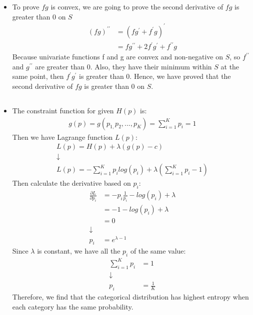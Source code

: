 \documentclass[pdftex,11pt]{article}
\begin{document}
\begin{itemize}
		\item To prove $fg$ is convex, we are going to prove the second derivative of $fg$ is greater than 0 on $S$
		\begin{align*}
			(fg)^{\prime\prime} 
			&= (fg^{\prime}+f^{\prime}g)^{\prime}\\
			&= fg^{\prime\prime}+2f^{\prime}g^{\prime}+f^{\prime\prime}g
		\end{align*} 
		Because univariate functions f and g are convex and non-negative on $S$, so $f^{\prime\prime}$ and $g^{\prime\prime}$ are greater than 0. Also, they have their minimum within $S$ at the same point, then $f^{\prime}g^{\prime} $ is greater than 0. Hence, we have proved that the second derivative of $fg$ is greater than 0 on $S$.
	\end{itemize}
	
	\subsection{}
	\begin{itemize}
		\item The constraint function for given $H(p)$ is:
		\begin{align*}
			g(p)=g(p_{1,}p_{2},...,p_{K})=\sum_{i=1}^{K}p_{i} = 1	
 		\end{align*}
		Then we have Lagrange function $L(p)$:
 		\begin{align*}
		L(p)=H(p)+\lambda(g(p)-c)\\
		\downarrow\\
 		L(p) = -\sum_{i = 1}^{K} p_i log(p_i) + \lambda (\sum_{i = 1}^{K} p_i - 1)
 		\end{align*}
 		Then calculate the derivative based on $p_i$:
 		\begin{align*}
		\frac{\partial L}{\partial p_{i}} &= -p_{i}\frac{1}{p_{i}}-log(p_{i})+\lambda\\
		&= - 1 - log(p_{i})+\lambda\\
		 &=0\\
		 \downarrow\\
		 p_i &= e^{\lambda - 1}
 		\end{align*}
		Since $\lambda$ is constant, we have all the $p_i$ of the same value:\\
		\begin{align*}
		\sum_{i=1}^{K}p_{i} &= 1\\
		 \downarrow\\
		p_{i} &= \frac{1}{K}
		\end{align*}
 		Therefore, we find that the categorical distribution has highest entropy when each category has the same probability.	
	\end{itemize}
\end{document}
